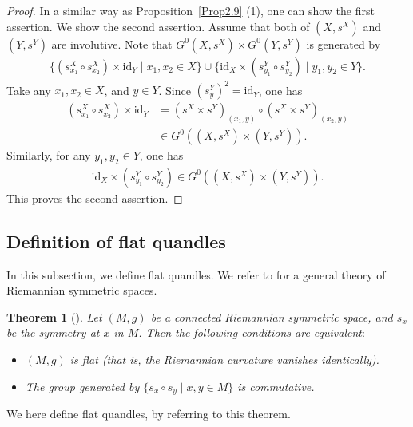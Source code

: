 \documentclass[12pt]{amsart}
\newtheorem{Thm}[Prop]{Theorem}
\theoremstyle{definition}
\begin{document}
\begin{proof}
In a similar way as Proposition~\ref{Prop2.9} (1), one can show the first assertion. We show the second assertion. Assume that both of $ (X,s^{X}) $ and $ (Y,s^{Y}) $ are involutive. Note that $ G^{0}(X,s^{X}) \times G^{0}(Y,s^{Y}) $ is generated by
\begin{align*}
\{ (s^{X}_{x_{1}} \circ s^{X}_{x_{2}}) \times {\mathrm{id}}_{Y} \mid x_{1}, x_{2} \in X \} \cup \{ {\mathrm{id}}_{X} \times (s^{Y}_{y_{1}} \circ s^{Y}_{y_{2}}) \mid y_{1}, y_{2} \in Y \}.
\end{align*}
Take any $ x_{1}, x_{2} \in X $, and $ y \in Y $. Since $ (s^{Y}_{y})^{2} = {\mathrm{id}}_{Y} $, one has
\begin{align*}
(s^{X}_{x_{1}} \circ s^{X}_{x_{2}}) \times {\mathrm{id}}_{Y} &= (s^{X} \times s^{Y})_{(x_{1},y)} \circ (s^{X} \times s^{Y})_{(x_{2},y)}\\
&\in G^{0}((X,s^{X}) \times (Y,s^{Y})).
\end{align*}
Similarly, for any $ y_{1}, y_{2} \in Y $, one has
\begin{align*}
{\mathrm{id}}_{X} \times (s^{Y}_{y_{1}} \circ s^{Y}_{y_{2}}) \in G^{0}((X,s^{X}) \times (Y,s^{Y})).
\end{align*}
This proves the second assertion.
\end{proof}

\subsection{Definition of flat quandles}

In this subsection, we define flat quandles. We refer to \cite{Loos} for a general theory of Riemannian symmetric spaces.

\begin{Thm}[\cite{Loos}]\label{Thm4.4}
Let $ (M,g) $ be a connected Riemannian symmetric space, and $ s_{x} $ be the symmetry at $ x $ in $ M $. Then the following conditions are equivalent$:$
\begin{itemize}
\item[(1)]
$ (M,g) $ is flat (that is, the Riemannian curvature vanishes identically).
\item[(2)]
The group generated by $ \{ s_{x} \circ s_{y} \mid x,y \in M \} $ is commutative.
\end{itemize}
\end{Thm}

We here define flat quandles, by referring to this theorem.
\end{document}
